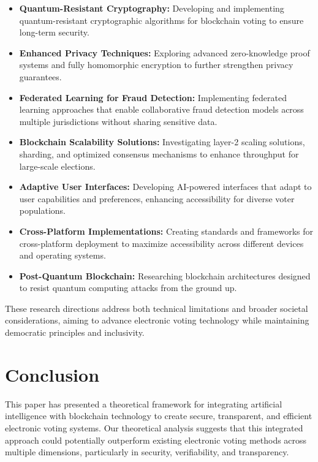 \documentclass[conference]{IEEEtran}
\begin{document}
\begin{itemize}
    \item \textbf{Quantum-Resistant Cryptography:} Developing and implementing quantum-resistant cryptographic algorithms for blockchain voting to ensure long-term security.
    
    \item \textbf{Enhanced Privacy Techniques:} Exploring advanced zero-knowledge proof systems and fully homomorphic encryption to further strengthen privacy guarantees.
    
    \item \textbf{Federated Learning for Fraud Detection:} Implementing federated learning approaches that enable collaborative fraud detection models across multiple jurisdictions without sharing sensitive data.
    
    \item \textbf{Blockchain Scalability Solutions:} Investigating layer-2 scaling solutions, sharding, and optimized consensus mechanisms to enhance throughput for large-scale elections.
    
    \item \textbf{Adaptive User Interfaces:} Developing AI-powered interfaces that adapt to user capabilities and preferences, enhancing accessibility for diverse voter populations.
    
    \item \textbf{Cross-Platform Implementations:} Creating standards and frameworks for cross-platform deployment to maximize accessibility across different devices and operating systems.
    
    \item \textbf{Post-Quantum Blockchain:} Researching blockchain architectures designed to resist quantum computing attacks from the ground up.
\end{itemize}

These research directions address both technical limitations and broader societal considerations, aiming to advance electronic voting technology while maintaining democratic principles and inclusivity.

\section{Conclusion}
This paper has presented a theoretical framework for integrating artificial intelligence with blockchain technology to create secure, transparent, and efficient electronic voting systems. Our theoretical analysis suggests that this integrated approach could potentially outperform existing electronic voting methods across multiple dimensions, particularly in security, verifiability, and transparency.
\end{document}
